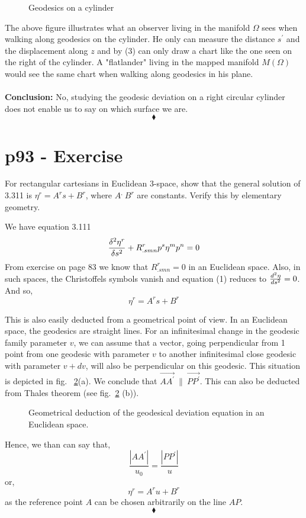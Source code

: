 \begin{figure}[H]
\begin{minipage}[t]{.4\textwidth}
\vspace{0pt}

\end{minipage}\hfill
\caption{Geodesics on a cylinder}
\label{fig:fig_p91_153_a}
\end{figure}
The above figure illustrates what an observer living in the manifold $\Omega$ sees when walking along geodesics on the cylinder.  He only can measure the distance $s^{'}$ and the displacement along $z$ and by (3) can only draw a chart like the one seen on the right of the cylinder. A "flatlander" living in the mapped manifold $M(\Omega)$ would see the same chart when walking along geodesics in his plane.\\\\
\textbf{Conclusion:} No, studying the geodesic deviation on a right circular cylinder does not enable us to say on which surface we are.
$$\blacklozenge$$
\newpage

\section{p93 - Exercise}
\begin{tcolorbox}
For rectangular cartesians in Euclidean 3-space, show that the general solution of 3.311 is $\eta^r = A^r s+B^r $, where $A^, \ B^r$ are constants. Verify this by elementary geometry. 
\end{tcolorbox}
We have equation 3.111
\begin{align}
\fdv[2]{\eta^r}{s}+ R^r_{.smn} p^s \eta^m p^n=0
\end{align}
From exercise on page 83 we know that $R^r_{.smn}=0$ in an Euclidean space. Also, in such spaces, the Christoffels symbols vanish and equation (1) reduces to $ \dv[2]{\eta}{s} = 0$. And so, $$\eta^r = A^r s+B^r $$

This is also easily deducted from a geometrical point of view. In an Euclidean space, the geodesics are straight lines. For an infinitesimal change in the geodesic family parameter $v$, we can assume that a vector, going perpendicular from 1 point from one geodesic with parameter $v$  to another infinitesimal close  geodesic with parameter $v+dv$,  will also be perpendicular on this geodesic. This situation is depicted in fig. ~\ref{fig:fig_p93_16}(a). We conclude that $\overrightarrow{AA^{'}} \ \parallel \ \overrightarrow{PP^{'}}$. This can also be deducted from Thales theorem (see fig.~\ref{fig:fig_p93_16} (b)). 
\begin{figure}[H]%
    \centering
    \subfloat[]{}
	\qquad
    \subfloat[]{}
\caption{Geometrical deduction of the geodesical deviation equation in an Euclidean space.}
\label{fig:fig_p93_16}
\end{figure}
Hence, we than can say that,
$$ \frac{\left|AA^{'}\right|}{u_0}=\frac{\left|PP^{'}\right|}{u}  $$
or, $$ \eta^r = A^r u + B^r $$ as the reference point $A$ can be chosen arbitrarily on the line $AP$.
$$\blacklozenge$$
\newpage


